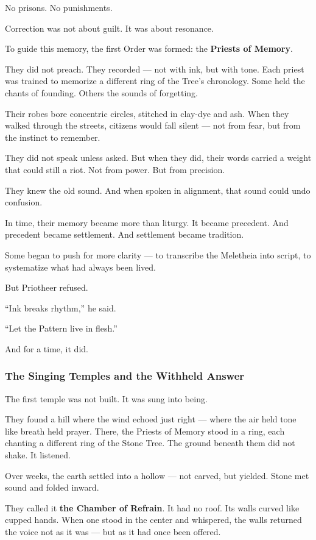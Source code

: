 \documentclass[12pt]{article}
\begin{document}
No prisons.  
No punishments.

Correction was not about guilt.  
It was about resonance.

To guide this memory, the first Order was formed:  
the \textbf{Priests of Memory}.

They did not preach.  
They recorded — not with ink, but with tone.  
Each priest was trained to memorize a different ring of the Tree’s chronology.  
Some held the chants of founding.  
Others the sounds of forgetting.

Their robes bore concentric circles, stitched in clay-dye and ash.  
When they walked through the streets, citizens would fall silent —  
not from fear,  
but from the instinct to remember.

They did not speak unless asked.  
But when they did, their words carried a weight that could still a riot.  
Not from power.  
But from precision.

They knew the old sound.  
And when spoken in alignment, that sound could undo confusion.

In time, their memory became more than liturgy.  
It became precedent.  
And precedent became settlement.  
And settlement became tradition.

Some began to push for more clarity —  
to transcribe the Meletheia into script,  
to systematize what had always been lived.

But Priotheer refused.

“Ink breaks rhythm,” he said.

“Let the Pattern live in flesh.”

And for a time, it did.

\dotfill

\subsubsection*{The Singing Temples and the Withheld Answer}

The first temple was not built.  
It was sung into being.

They found a hill where the wind echoed just right —  
where the air held tone like breath held prayer.  
There, the Priests of Memory stood in a ring, each chanting a different ring of the Stone Tree.  
The ground beneath them did not shake.  
It listened.

Over weeks, the earth settled into a hollow — not carved, but yielded.  
Stone met sound and folded inward.

They called it \textbf{the Chamber of Refrain}.  
It had no roof.  
Its walls curved like cupped hands.  
When one stood in the center and whispered,  
the walls returned the voice not as it was —  
but as it had once been offered.
\end{document}
